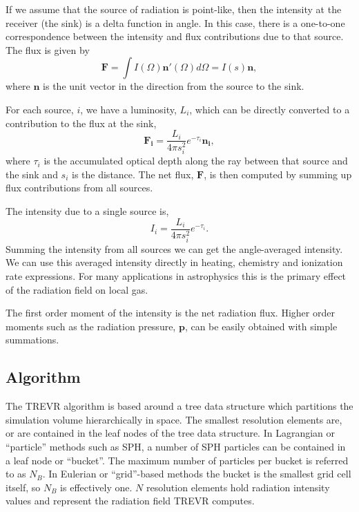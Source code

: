 \documentclass[fleq,usenatbib]{mnras}
\newcommand{\acro}{TREVR}
\begin{document}
{If we assume that the source of radiation is point-like, then the intensity at 
the receiver (the sink) is a delta function in angle. In this case, there is a 
one-to-one correspondence between the intensity and flux contributions due to 
that source. The flux is given by 
\begin{equation}
  \mathbf{F} = \int I(\Omega) \mathbf{n'}(\Omega) d\Omega = I(s) \mathbf{n},
\end{equation}
where $\mathbf{n}$ is the unit vector in the direction from the source to the 
sink.

For each source, $i$, we have a luminosity, $L_i$, which can be directly 
converted to a contribution to the flux at the sink,
\begin{equation}
\label{eqn:simpflux}
\mathbf{F_i} = \frac{L_i}{4\pi s_i^2} e^{-\tau_i} \mathbf{n_i},
\end{equation}
where $\tau_i$ is the accumulated optical depth along the ray between that 
source and the sink and $s_i$ is the distance. The net flux, $\mathbf{F}$, is 
then computed by summing up flux contributions from all sources.

The intensity due to a single source is,
\begin{equation}
\label{eqn:simpint}
I_i = \frac{L_i}{4\pi s_i^2} e^{-\tau_i}.
\end{equation}
Summing the intensity from all sources we can get the angle-averaged intensity. We 
can use this averaged intensity directly in heating, chemistry and ionization 
rate expressions. For many applications in astrophysics this is the primary 
effect of the radiation field on local gas.

The first order moment of the intensity is the net radiation flux.  Higher 
order moments such as the radiation pressure, $\mathbf{p}$, can be easily 
obtained with simple summations.


\subsection{Algorithm}\label{sec:algo}
The \acro{} algorithm is based around a tree data structure which partitions 
the simulation volume hierarchically in space. The smallest resolution 
elements are, or are contained in the leaf nodes of the tree data 
structure. In Lagrangian or ``particle'' methods such as SPH, a number of SPH 
particles can be contained in a leaf node or ``bucket''. The maximum number of 
particles per bucket is referred to as $N_B$. In Eulerian or ``grid''-based 
methods the bucket is the smallest grid cell itself, so $N_B$ is effectively 
one. $N$ resolution elements hold radiation intensity values and represent the 
radiation field \acro{} computes. 



}
\end{document}
